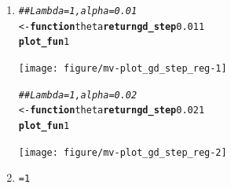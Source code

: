 \documentclass[a4paper]{article}
\makeatletter
\newcommand{\hlnum}[1]{\textcolor[rgb]{0.686,0.059,0.569}{#1}}%
\newcommand{\hlcom}[1]{\textcolor[rgb]{0.678,0.584,0.686}{\textit{#1}}}%
\newcommand{\hlkwa}[1]{\textcolor[rgb]{0.161,0.373,0.58}{\textbf{#1}}}%
\newcommand{\hlkwb}[1]{\textcolor[rgb]{0.69,0.353,0.396}{#1}}%
\newcommand{\hlkwc}[1]{\textcolor[rgb]{0.333,0.667,0.333}{#1}}%
\newcommand{\hlkwd}[1]{\textcolor[rgb]{0.737,0.353,0.396}{\textbf{#1}}}%
\newenvironment{kframe}{%
 \def\at@end@of@kframe{}%
 \ifinner\ifhmode%
  \def\at@end@of@kframe{\end{minipage}}%
  \begin{minipage}{\columnwidth}%
 \fi\fi%
 \def\FrameCommand##1{\hskip\@totalleftmargin \hskip-\fboxsep
 \colorbox{shadecolor}{##1}\hskip-\fboxsep
     \hskip-\linewidth \hskip-\@totalleftmargin \hskip\columnwidth}%
 \MakeFramed {\advance\hsize-\width
   \@totalleftmargin\z@ \linewidth\hsize
   \@setminipage}}%
 {\par\unskip\endMakeFramed%
 \at@end@of@kframe}
\newenvironment{knitrout}{}{} %
\makeatother
\begin{document}
{\begin{enumerate}
\begin{knitrout}
\begin{kframe}
\begin{alltt}
\hlcom{## Alpha = 0.01}
 \hlkwb{<-} \hlkwa{function}\hldef{(}\hlkwc{theta}\hldef{)} \hlkwd{return}\hldef{(}\hlkwd{gd_step} \hlnum{0.01}
\hlkwd{plot_fun} \hlnum{0}\hldef{)}
\end{alltt}
\end{kframe}
\texttt{[image: figure/mv-plot\_gd\_step-1]} 
\begin{kframe}\begin{alltt}
\hlcom{## Alpha = 0.02}
 \hlkwb{<-} \hlkwa{function}\hldef{(}\hlkwc{theta}\hldef{)} \hlkwd{return}\hldef{(}\hlkwd{gd_step} \hlnum{0.02}
\hlkwd{plot_fun} \hlnum{0}\hldef{)}
\end{alltt}
\end{kframe}
\texttt{[image: figure/mv-plot\_gd\_step-2]} 
\end{knitrout}

Gradient descent will in theory not converge since $\mathcal{R}_\text{emp}$ has no minimum (a)
\item

\begin{knitrout}
\color{fgcolor}\begin{kframe}
\begin{alltt}
\hlcom{## Lambda = 1, alpha = 0.01}
 \hlkwb{<-} \hlkwa{function}\hldef{(}\hlkwc{theta}\hldef{)} \hlkwd{return}\hldef{(}\hlkwd{gd_step} \hlnum{0.01}\hldef{,} \hlnum{1}\hldef{))}
\hlkwd{plot_fun} \hlnum{1}\hldef{)}
\end{alltt}
\end{kframe}
\texttt{[image: figure/mv-plot\_gd\_step\_reg-1]} 
\begin{kframe}\begin{alltt}
\hlcom{## Lambda = 1, alpha = 0.02}
 \hlkwb{<-} \hlkwa{function}\hldef{(}\hlkwc{theta}\hldef{)} \hlkwd{return}\hldef{(}\hlkwd{gd_step} \hlnum{0.02}\hldef{,} \hlnum{1}\hldef{))}
\hlkwd{plot_fun} \hlnum{1}\hldef{)}
\end{alltt}
\end{kframe}
\texttt{[image: figure/mv-plot\_gd\_step\_reg-2]} 
\end{knitrout}

\item 
\begin{knitrout}
\color{fgcolor}\begin{kframe}
\begin{alltt}
 \hlkwb{=} \hlnum{1}


\end{alltt}
\end{kframe}
\end{knitrout}
\end{enumerate}}
\end{document}
